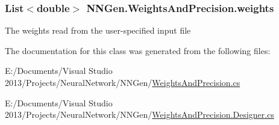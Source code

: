 \subsubsection[{weights}]{\setlength{\rightskip}{0pt plus 5cm}List$<$double$>$ N\+N\+Gen.\+Weights\+And\+Precision.\+weights\hspace{0.3cm}{\ttfamily [get]}}\label{class_n_n_gen_1_1_weights_and_precision_afe90c4fc998ce882228b7bf4459cf100}


The weights read from the user-\/specified input file 



The documentation for this class was generated from the following files\+:\begin{DoxyCompactItemize}
\item 
E\+:/\+Documents/\+Visual Studio 2013/\+Projects/\+Neural\+Network/\+N\+N\+Gen/\hyperlink{_weights_and_precision_8cs}{Weights\+And\+Precision.\+cs}\item 
E\+:/\+Documents/\+Visual Studio 2013/\+Projects/\+Neural\+Network/\+N\+N\+Gen/\hyperlink{_weights_and_precision_8_designer_8cs}{Weights\+And\+Precision.\+Designer.\+cs}\end{DoxyCompactItemize}
